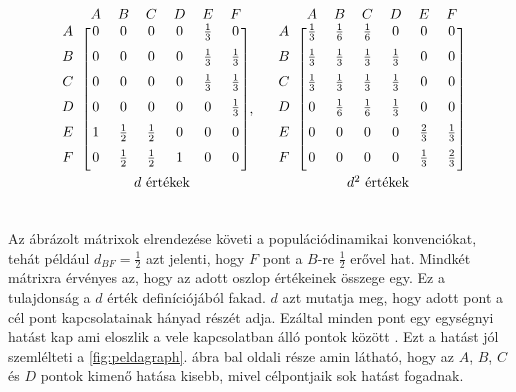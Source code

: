 \documentclass[a4paper,12pt]{article}
\begin{document}
	\[
	\begin{blockarray}{ccccccc}
	&A & B & C & D & E & F \\
	\begin{block}{c [cccccc]}
	A &0 & 0 & 0 & 0 & \frac{1}{3} & 0 \\[6pt]
	B & 0 & 0 & 0 & 0 & \frac{1}{3} & \frac{1}{3}\\[6pt]
	C & 0 & 0 & 0 & 0 & \frac{1}{3} & \frac{1}{3}\\[6pt]
	D & 0 & 0 & 0 & 0 & 0 & \frac{1}{3}\\[6pt]
	E & 1 & \frac{1}{2} & \frac{1}{2} & 0 & 0 & 0\\ [6pt]
	F & 0 & \frac{1}{2} & \frac{1}{2} & 1 & 0 & 0\\ [6pt]
	\end{block}
	\multicolumn{7}{c}{\indent $d$ értékek} \\ [6pt]
	\end{blockarray},\quad
	\begin{blockarray}{ccccccc}
	&A & B & C & D & E & F \\
	\begin{block}{c [cccccc]}
	A & \frac{1}{3} & \frac{1}{6} & \frac{1}{6} & 0 & 0 & 0 \\[6pt]
	B & \frac{1}{3} & \frac{1}{3} & \frac{1}{3} & \frac{1}{3} & 0 & 0\\ [6pt]
	C & \frac{1}{3} & \frac{1}{3} & \frac{1}{3} & \frac{1}{3} & 0 & 0\\[6pt]
	D & 0 & \frac{1}{6} & \frac{1}{6} & \frac{1}{3} & 0 & 0\\[6pt]
	E & 0 & 0 & 0 & 0 & \frac{2}{3} & \frac{1}{3}\\ [6pt]
	F & 0 & 0 & 0 & 0 & \frac{1}{3} & \frac{2}{3}\\ [6pt]
	\end{block}
	\multicolumn{7}{c}{\indent $d^2$ értékek} \\[6pt]
	\end{blockarray}
	\]

	Az ábrázolt mátrixok elrendezése követi a populációdinamikai konvenciókat, tehát például $d_{BF}=\frac{1}{2}$ azt jelenti, hogy $F$ pont a $B$-re $\frac{1}{2}$ erővel hat. Mindkét mátrixra érvényes az, hogy az adott oszlop értékeinek összege egy. Ez a tulajdonság a $d$ érték definíciójából fakad. $d$ azt mutatja meg, hogy adott pont a cél pont kapcsolatainak hányad részét adja. Ezáltal minden pont egy egységnyi hatást kap ami eloszlik a vele kapcsolatban álló pontok között \cite{ti}. Ezt a hatást jól szemlélteti a \ref{fig:peldagraph}. ábra bal oldali része amin látható, hogy az $A$, $B$, $C$ és $D$ pontok kimenő hatása kisebb, mivel célpontjaik sok hatást fogadnak.
\end{document}
